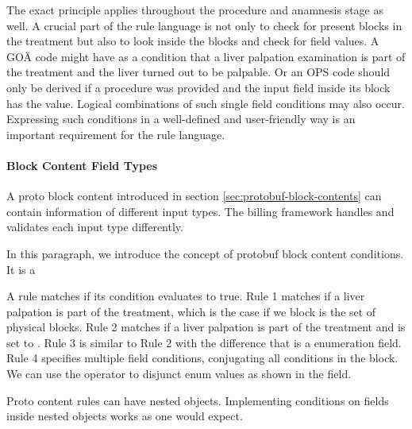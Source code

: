 The exact principle applies throughout the procedure and anamnesis stage as well.
A crucial part of the rule language is not only to check for present blocks in the treatment
but also to look inside the blocks and check for field values.
A GOÄ code might have as a condition that a liver palpation examination is part of the treatment and
the liver turned out to be palpable.
Or an OPS code should only be derived if a  procedure was provided and the
input field  inside its block has the value\true.
Logical combinations of such single field conditions may also occur.
Expressing such conditions in a well-defined and user-friendly way is an important requirement for the rule language.

\paragraph{Block Content Field Types}
A proto block content introduced in section \ref{sec:protobuf-block-contents} can contain information of different input types.
The billing framework handles and validates each input type differently.

In this paragraph, we introduce the concept of protobuf block content conditions.
It is a



A rule matches if its condition evaluates to true.
Rule 1 matches if a liver palpation is part of the treatment, which is the case if we  block is the set of physical blocks.
Rule 2 matches if a liver palpation is part of the treatment and  is set to \true.
Rule 3 is similar to Rule 2 with the difference that  is a enumeration field.
Rule 4 specifies multiple field conditions, conjugating all conditions in the block.
We can use the \code{|} operator to disjunct enum values as shown in the  field.

Proto content rules can have nested objects.
Implementing conditions on fields inside nested objects works as one would expect.



